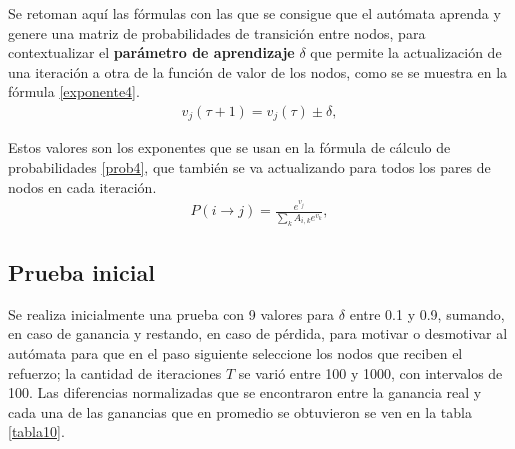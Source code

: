 Se retoman aquí las fórmulas con las que se consigue que el autómata aprenda y genere una matriz de probabilidades de transición entre nodos, para contextualizar el \textbf{parámetro de aprendizaje} $\delta$ que permite la actualización de una iteración a otra de la función de valor de los nodos, como se se muestra en la fórmula \ref{exponente4}.
\begin{eqnarray}\label{exponente4}
v_j(\tau + 1) = v_j(\tau) \pm \delta,
\end{eqnarray}

Estos valores son los exponentes que se usan en la fórmula de cálculo de probabilidades \ref{prob4}, que también se va actualizando para todos los pares de nodos en cada iteración.
\begin{eqnarray}\label{prob4}
P(i \to j) = \frac{e^{v_j}}{\sum_k A_{i,k} e^{v_k}},
\end{eqnarray}


\subsection{Prueba inicial}

Se realiza inicialmente una prueba con 9 valores para $\delta$ entre 0.1 y 0.9, sumando, en caso de ganancia y restando, en caso de pérdida, para motivar o desmotivar al autómata para que en el paso siguiente seleccione los nodos que reciben el refuerzo; la cantidad de iteraciones $T$ se varió entre 100 y 1000, con intervalos de 100. Las diferencias normalizadas que se encontraron entre la ganancia real y cada una de las ganancias que en promedio se obtuvieron se ven en la tabla \ref{tabla10}.

